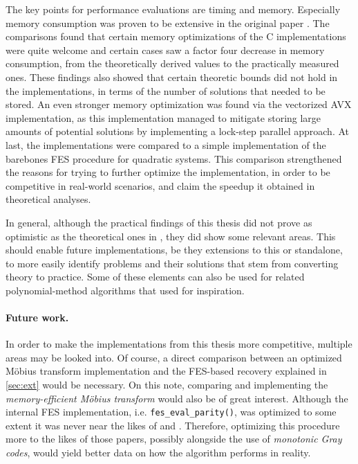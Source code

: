 The key points for performance evaluations are timing and memory. Especially memory consumption was proven to be extensive in the original paper \cite{eurocrypt-2021-30841}. The comparisons found that certain memory optimizations of the C implementations were quite welcome and certain cases saw a factor four decrease in memory consumption, from the theoretically derived values to the practically measured ones. These findings also showed that certain theoretic bounds did not hold in the implementations, in terms of the number of solutions that needed to be stored. An even stronger memory optimization was found via the vectorized AVX implementation, as this implementation managed to mitigate storing large amounts of potential solutions by implementing a lock-step parallel approach. At last, the implementations were compared to a simple implementation of the barebones FES procedure for quadratic systems. This comparison strengthened the reasons for trying to further optimize the implementation, in order to be competitive in real-world scenarios, and claim the speedup it obtained in theoretical analyses. 

In general, although the practical findings of this thesis did not prove as optimistic as the theoretical ones in \cite{eurocrypt-2021-30841}, they did show some relevant areas. This should enable future implementations, be they extensions to this or standalone, to more easily identify problems and their solutions that stem from converting theory to practice. Some of these elements can also be used for related polynomial-method algorithms that \cite{eurocrypt-2021-30841} used for inspiration.

\paragraph{Future work.} In order to make the implementations from this thesis more competitive, multiple areas may be looked into. Of course, a direct comparison between an optimized Möbius transform implementation and the FES-based recovery explained in \cref{sec:ext} would be necessary. On this note, comparing and implementing the \textit{memory-efficient Möbius transform} would also be of great interest. Although the internal FES implementation, i.e. \texttt{fes\_eval\_parity()}, was optimized to some extent it was never near the likes of \cite{ches-2010-23990} and \cite{cryptoeprint:2013/436}. Therefore, optimizing this procedure more to the likes of those papers, possibly alongside the use of \textit{monotonic Gray codes}, would yield better data on how the algorithm performs in reality.

